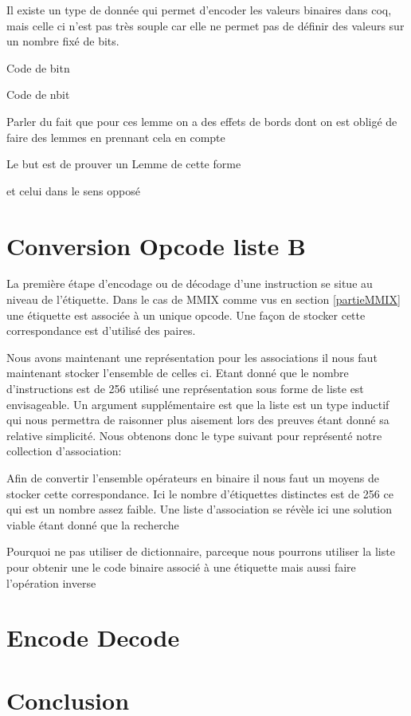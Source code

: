\documentclass {article}
\newcommand{\codefrom}[3]
           {}
\theoremstyle{definition}
\theoremstyle{remark}
\begin{document}
Il existe un type de donnée qui permet d'encoder les valeurs binaires dans coq, mais celle ci
n'est pas très souple car elle ne permet pas de définir des valeurs sur un nombre fixé de bits.



Code de bitn
\codefrom{src}{binary}{bitn}

Code de nbit
\codefrom{src}{binary}{nbit}


Parler du fait que pour ces lemme on a des effets de bords dont on est obligé
de faire des lemmes en prennant cela en compte 

Le but est de prouver un Lemme de cette forme
\codefrom{src}{binary}{nbitn}

et celui dans le sens opposé 
\codefrom{src}{binary}{bitnbit}






\section{Conversion Opcode liste B}
\label{partieOpcode}

La première étape d'encodage ou de décodage d'une instruction se situe
au niveau de l'étiquette. Dans le cas de MMIX comme vus en section \ref{partieMMIX}
une étiquette est associée à un unique opcode. Une façon de stocker cette
correspondance est d'utilisé des paires.
\codefrom{src}{association_list}{assoc}

Nous avons maintenant une représentation pour les associations il nous faut
maintenant stocker l'ensemble de celles ci. Etant donné que le nombre
d'instructions est de 256 utilisé une représentation sous forme
de liste est envisageable. Un argument supplémentaire est que la liste
est un type inductif qui nous permettra de raisonner plus aisement
lors des preuves étant donné sa relative simplicité.
Nous obtenons donc le type suivant pour représenté notre collection d'association:

\codefrom{src}{association_list}{tag_opcode_assoc}


\remark{}





Afin de convertir l'ensemble opérateurs en binaire il nous faut
un moyens de stocker cette correspondance.
Ici le nombre d'étiquettes distinctes est de 256 ce qui est un nombre
assez faible. Une liste d'association se révèle ici une solution viable
étant donné que la recherche



Pourquoi ne pas utiliser de dictionnaire, parceque nous pourrons utiliser
la liste pour obtenir une le code binaire associé à une étiquette mais aussi faire
l'opération inverse


\section{Encode Decode}

\section{Conclusion}
\end{document}

